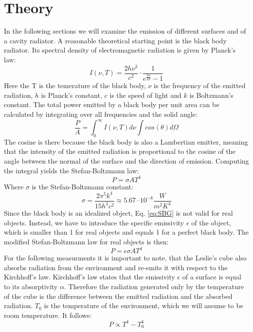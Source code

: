 \section{Theory}

In the following sections we will examine the emission of different surfaces and of a cavity radiator.
A reasonable theoretical starting point is the black body radiator. Its spectral density of electromagnetic radiation is given by Planck's law:
\begin{equation}
    I(\nu, T) = \frac{2h\nu^3}{c^2} \cdot \frac{1}{e^{\frac{h\nu}{k T}} - 1}
\end{equation}
Here the T is the temerature of the black body, $\nu$ is the frequency of the emitted radiation, $h$ is Planck's constant, $c$ is the speed of light and $k$ is Boltzmann's constant. 
The total power emitted by a black body per unit area can be calculated by integrating over all frequencies and the solid angle:
\begin{equation}
    \frac{P}{A} = \int_0^\infty I(\nu, T) d\nu \int cos(\theta) d\Omega 
\end{equation}
The cosine is there because the black body is also a Lambertian emitter, meaning that the intensity of the emitted radiation is proportional to the cosine of the angle between the normal of the surface and the direction of emission.
Computing the integral yields the Stefan-Boltzmann law:
\begin{equation}
    P = \sigma A T^4
    \label{eq:SBG}
\end{equation}
Where $\sigma$ is the Stefan-Boltzmann constant:
\begin{equation}
    \sigma = \frac{2\pi^5 k^4}{15 h^3 c^2} \approx 5.67 \cdot 10^{-8} \frac{W}{m^2 K^4}
\end{equation}
Since the black body is an idealized object, Eq. \ref{eq:SBG} is not valid for real objects. Instead, we have to introduce the specific emissivity $\epsilon$ of the object, which is smaller than 1 for real objects and equals 1 for a perfect black body.
The modified Stefan-Boltzmann law for real objects is then:
\begin{equation}
    P = \epsilon \sigma A T^4
    \label{eq:SBGreal}
\end{equation}
For the following measurments it is important to note, that the Leslie's cube also absorbs radiation from the environment and re-emits it with respect to the Kirchhoff's law.
Kirchhoff's law states that the emissivity $\epsilon$ of a surface is equal to its absorptivity $\alpha$.
Therefore the radiation generated only by the temperature of the cube is the difference between the emitted radiation and the absorbed radiation.
$T_0$ is the temperature of the environment, which we will assume to be room temperature.
It follows:
\begin{equation}
    P \propto T^4 - T_0^4
\end{equation}